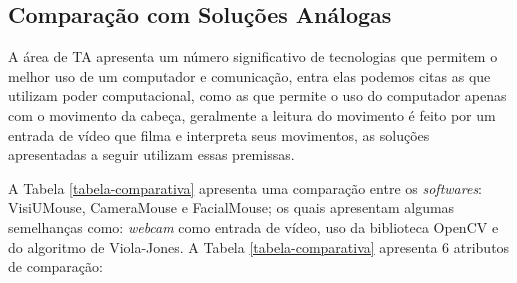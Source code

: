 \subsection{Comparação com Soluções Análogas}\label{Sub:tabela-comparativa}
A área de TA apresenta um número significativo de tecnologias que permitem o melhor uso de um computador e comunicação, entra elas podemos citas as que utilizam poder computacional, como as que permite o uso do computador apenas com o movimento da cabeça, geralmente a leitura do movimento é feito por um  entrada de vídeo que filma e interpreta seus movimentos, as soluções apresentadas a seguir utilizam essas premissas.

A Tabela \ref{tabela-comparativa} apresenta uma comparação entre os \textit{softwares}: VisiUMouse, CameraMouse e FacialMouse; os quais apresentam algumas semelhanças como: \textit{webcam} como entrada de vídeo, uso da biblioteca OpenCV e do algoritmo de Viola-Jones. A Tabela \ref{tabela-comparativa} apresenta 6 atributos de comparação:

